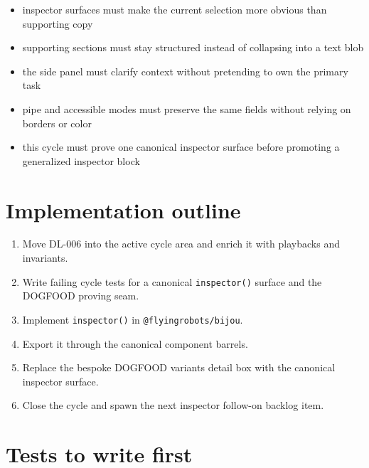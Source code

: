 \begin{itemize}
\tightlist
\item
  inspector surfaces must make the current selection more obvious than supporting copy
\item
  supporting sections must stay structured instead of collapsing into a text blob
\item
  the side panel must clarify context without pretending to own the primary task
\item
  pipe and accessible modes must preserve the same fields without relying on borders or color
\item
  this cycle must prove one canonical inspector surface before promoting a generalized inspector block
\end{itemize}

\section{Implementation outline}\label{record-173-implementation-outline}

\begin{enumerate}
\def\labelenumi{\arabic{enumi}.}
\tightlist
\item
  Move DL-006 into the active cycle area and enrich it with playbacks and invariants.
\item
  Write failing cycle tests for a canonical \texttt{i\allowbreak{}n\allowbreak{}s\allowbreak{}p\allowbreak{}e\allowbreak{}c\allowbreak{}t\allowbreak{}o\allowbreak{}r\allowbreak{}(\allowbreak{})} surface and the DOGFOOD proving seam.
\item
  Implement \texttt{i\allowbreak{}n\allowbreak{}s\allowbreak{}p\allowbreak{}e\allowbreak{}c\allowbreak{}t\allowbreak{}o\allowbreak{}r\allowbreak{}(\allowbreak{})} in \texttt{@\allowbreak{}f\allowbreak{}l\allowbreak{}y\allowbreak{}i\allowbreak{}n\allowbreak{}g\allowbreak{}r\allowbreak{}o\allowbreak{}b\allowbreak{}o\allowbreak{}t\allowbreak{}s\allowbreak{}/\allowbreak{}b\allowbreak{}i\allowbreak{}j\allowbreak{}o\allowbreak{}u}.
\item
  Export it through the canonical component barrels.
\item
  Replace the bespoke DOGFOOD variants detail box with the canonical inspector surface.
\item
  Close the cycle and spawn the next inspector follow-on backlog item.
\end{enumerate}

\section{Tests to write first}\label{record-173-tests-to-write-first}

